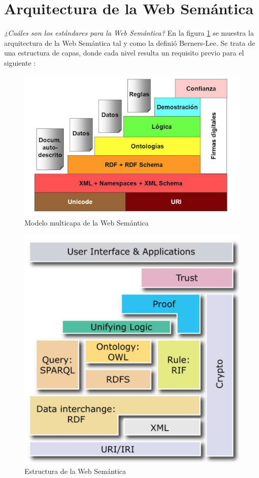 \section{Arquitectura de la Web Semántica}


\textit{¿Cuáles son los estándares para la Web Semántica?} En la figura \ref{fig:arquitectura1} se muestra la arquitectura de la Web Semántica tal y como la definió Berners-Lee. Se trata de una estructura de capas, donde cada nivel resulta un requisito previo para el siguiente \cite{researchgate}:

\begin{figure}[H]
	\centering
	\includegraphics[width=0.7\linewidth]{imagenes/capitulo3/arquitectura1} 
	\caption{Modelo multicapa de la Web Semántica}
	\label{fig:arquitectura1}
\end{figure}

\begin{figure}[H]
	\centering
	\includegraphics[width=0.55\linewidth]{imagenes/capitulo3/arquitectura2}
	\caption{Estructura de la Web Semántica}
	\label{fig:arquitectura2}
\end{figure}

